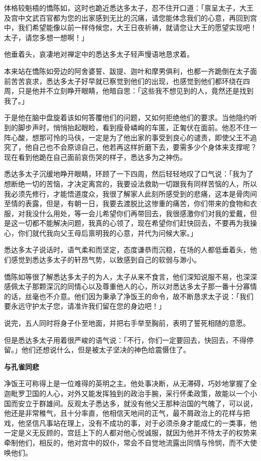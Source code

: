 \documentclass[12pt,twoside,openany]{book}
\newcommand{\mt}[1]{\textbullet \textbf{#1}}
\begin{document}
体格较魁梧的憍陈如，这时也跪近悉达多太子，忍不住开口道：「禀呈太子，大王及宫中文武百官都为您的出家感到无比的沉痛，请您能体念我们的心意，再回到宫中，我们希望能像以前一样侍候您，大王日夜祈祷，就请您让大王的愿望实现吧！太子，请您多想一想啊！」

他垂着头，哀凄地对禅定中的悉达多太子轻声慢语地恳求着。

本来站在憍陈如旁边的阿舍婆誓、跋提、迦叶和摩男俱利，也都一齐跪倒在太子面前苦苦哀求，悉达多太子好早就已察觉到他们的出现，也感觉到他们都环绕在四周，只是他并不立刻睁开眼睛，他暗自思：「这些我不想见到的人，竟然还是找到我了。」

于是他在脑中盘旋着该如何答覆他们的问题，又如何拒绝他们的要求。当他隐约听到的脚步声时，悄悄抬起眼睑，看到瘦骨嶙峋的车匿，正匍伏在面前。他忍不住一阵心酸，想那可怜的马伕，一定是为了他出家的事受到良心的谴责，即使父王不追究了，他自己也不会原谅自己，他若再这样折磨下去，要需多少个身体来支撑呢？现在看到他跪在自己面前哀伤哭的样子，悉达多为之神伤。

悉达多太子沉缓地睁开眼睛，环顾了一下四周，然后轻轻地叹了口气说：「我为了想断绝一切的苦恼，才决定离宫的，我要设法救助一切跟我有同样苦恼的人，所以我必须先修行，才能悟道度众，我很了解家人此刻所感受到的悲痛，这本是骨肉间至情的表露，但是，有朝一日，我要去渡脱比这惨重的痛苦，你们带来的食物和衣服，对我没什么用处，等一会儿希望你们再带回去，我很感激你们对我的爱戴，但是这一切都不能解决问题，我真的心领了，现在希望你们赶快回去，不要再为我操心，你们就代我向父王母后禀明我的心意，并代为问候大家。」

悉达多太子说话时，语气柔和而坚定，态度谦恭而沉稳，在场的人都低垂着头，他们感觉到悉达多太子的轩昂气势，以致感到自己的软弱与渺小。

憍陈如等很了解悉达多太子的为人，太子从来不食言，他们深知说服不易，也深深感佩太子那颗深沉的同情心以及尊重他人的心，所以对悉达多太子那一番十分寡情的话，丝毫也不介意。他们因为秉承了净饭王的命令，故不断恳求太子说：「我们要永远守护太子您，请准许我们留在您的身边吧！」

说完，五人同时将身子仆至地面，并把右手举至胸前，表明了誓死相随的意愿。

但是悉达多太子用着很严峻的语气说：「不行，你们一定要回去，快回去，不得停留。」他们还想说什么，但是被太子坚决的神色给震慑住了。

\mt{与孔雀同悲}

净饭王可称得上是一位难得的英明之主。他处事决断，从无滞碍，巧妙地掌握了全迦毗罗卫国的人心，对外又能发挥独到的政治手腕，采行怀柔政策，故能以一个小国而安立于群雄间。反观太子悉达多，就没有他父王那种治国的气魄了，可以说，他还是非常稚气，且十分率直，他相信天地间的正气，最不屑政治上的花样与把戏，他坚信凡事站在理上，没有不成功的事，对于必须杀身才能成仁的一类事，他一定是义无反顾的，宫廷上下的人都对他心悦诚服，就因为他并不恃太子的权势来牵制他们，相反的，他对宫中的奴仆，常会不自觉地流露出同情与怜悯，而不大使唤他们。
\end{document}
